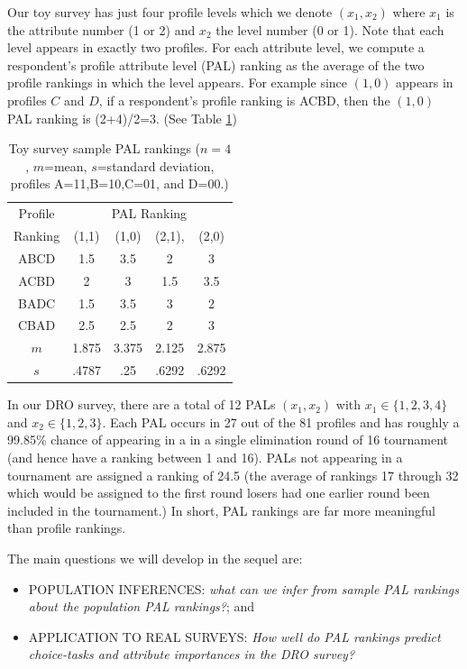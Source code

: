 \documentclass[a4paper, 12pt]{article}
\begin{document}
Our toy survey has just four profile levels which we denote $(x_1,x_2)$ where $x_1$ is the attribute number (1 or 2) and $x_2$ the level number (0 or 1). Note that each level appears in exactly two profiles. For each attribute level, we compute a respondent's profile attribute level (PAL) ranking as the average of the two profile rankings in which the level appears.  For example since $(1,0)$ appears in profiles $C$ and $D$, if a respondent's profile ranking is ACBD, then the $(1,0)$ PAL ranking is (2+4)/2=3. (See Table \ref{PAL1})


\begin{table}[!htpb]
	
	\centering
	\begin{tabular}{c|cccc}
		Profile&\multicolumn{4}{c}{PAL Ranking}\\
		Ranking&(1,1)&(1,0)&(2,1),&(2,0)\\\hline
		ABCD& 1.5&3.5&2&3\\
		ACBD& 2&3&1.5&3.5\\
		BADC&1.5&3.5&3&2 \\
		CBAD& 2.5&2.5&2&3 \\\hline
		$m$&1.875&3.375&2.125&2.875\\
		$s$ &.4787&.25&.6292&.6292\\
	\end{tabular}
	\caption{Toy survey sample PAL rankings ($n=4$, $m$=mean, $s$=standard deviation, profiles A=11,B=10,C=01, and D=00.)}
	\label{PAL1}
\end{table}



In our DRO survey, there are  a total of 12 PALs $(x_1,x_2)$ with $x_1\in\{1,2,3,4\}$ and $x_2\in\{1,2,3\}$. Each PAL occurs in 27 out of the 81 profiles and has roughly a 99.85\% chance of appearing in a  in a single elimination round of 16 tournament (and hence have a ranking between 1 and 16). PALs not appearing in a tournament are assigned a ranking of 24.5 (the average of rankings 17 through 32 which would be assigned to the first round losers had one earlier round been included in the tournament.)  In short, PAL rankings are far more meaningful than profile rankings.



The main questions we will develop in the sequel are: 
\begin{itemize}
\item POPULATION INFERENCES: \emph{what can we infer from sample PAL rankings about the population PAL rankings?}; and
\item APPLICATION TO REAL SURVEYS:  \emph{How well do PAL rankings predict  choice-tasks and attribute importances in the DRO survey?}
\end{itemize}
\end{document}
